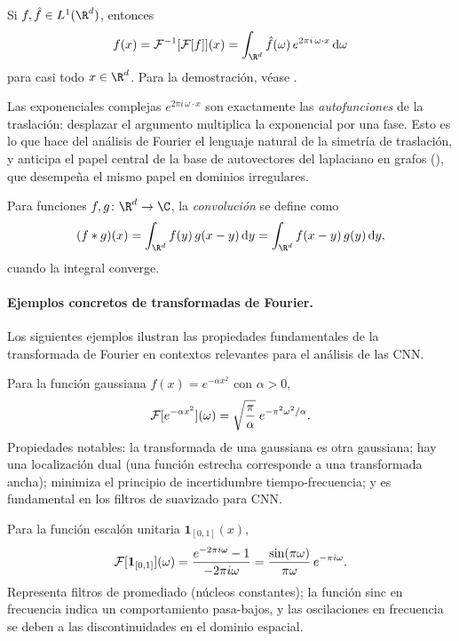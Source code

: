 \begin{theorem}
\label{thm:grids:inversion}
Si $f, \hat{f} \in L^1(\R^d)$, entonces
\[
  f(x) = \Ft^{-1}[\Ft[f]](x)
   = \int_{\R^d} \hat{f}(\omega)\, e^{2\pi i\, \omega \cdot x}\, \mathrm{d}\omega
\]
para casi todo $x \in \R^d$. Para la demostraci\'on, v\'ease
\citep[Theorem~8.26]{Folland1999}.
\end{theorem}

Las exponenciales complejas $e^{2\pi i\,\omega\cdot x}$ son exactamente las
\emph{autofunciones} de la traslaci\'on: desplazar el argumento multiplica la
exponencial por una fase. Esto es lo que hace del an\'alisis de Fourier el
lenguaje natural de la simetr\'ia de traslaci\'on, y anticipa el papel central
de la base de autovectores del laplaciano en grafos (), que
desempe\~na el mismo papel en dominios irregulares.

\begin{definition}[Convoluci\'on en $\R^d$]
\label{def:grids:convolucion-continua}
Para funciones $f, g \colon \R^d \to \C$, la \emph{convoluci\'on} se define como
\[
  (f \conv g)(x) = \int_{\R^d} f(y)\, g(x - y)\, \mathrm{d}y
   = \int_{\R^d} f(x - y)\, g(y)\, \mathrm{d}y,
\]
cuando la integral converge.
\end{definition}

\paragraph{Ejemplos concretos de transformadas de Fourier.}
Los siguientes ejemplos ilustran las propiedades fundamentales de la
transformada de Fourier en contextos relevantes para el an\'alisis de las CNN.

\begin{example}
\label{ex:grids:fourier-gaussian}
Para la funci\'on gaussiana $f(x) = e^{-\alpha x^2}$ con $\alpha > 0$,
\[
  \mathcal{F}[e^{-\alpha x^2}](\omega) = \sqrt{\frac{\pi}{\alpha}}\; e^{-\pi^2 \omega^2/\alpha}.
\]
Propiedades notables: la transformada de una gaussiana es otra gaussiana; hay
una localizaci\'on dual (una funci\'on estrecha corresponde a una transformada
ancha); minimiza el principio de incertidumbre tiempo-frecuencia; y es
fundamental en los filtros de suavizado para CNN.
\end{example}

\begin{example}
\label{ex:grids:fourier-step}
Para la funci\'on escal\'on unitaria $\mathbf{1}_{[0,1]}(x)$,
\[
  \mathcal{F}[\mathbf{1}_{[0,1]}](\omega)
   = \frac{e^{-2\pi i \omega} - 1}{-2\pi i \omega}
   = \frac{\sin(\pi\omega)}{\pi\omega}\, e^{-\pi i \omega}.
\]
Representa filtros de promediado (n\'ucleos constantes); la funci\'on sinc en
frecuencia indica un comportamiento pasa-bajos, y las oscilaciones en frecuencia
se deben a las discontinuidades en el dominio espacial.
\end{example}

